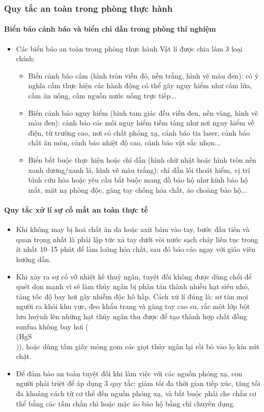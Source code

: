\subsubsection{Quy tắc an toàn trong phòng thực hành}

\paragraph{Biển báo cảnh báo và biển chỉ dẫn trong phòng thí nghiệm}
\begin{itemize}
\item Các biển báo an toàn trong phòng thực hành Vật lí được chia làm 3 loại chính:
\begin{itemize}
\item Biển cảnh báo cấm (hình tròn viền đỏ, nền trắng, hình vẽ màu đen): có ý nghĩa cấm thực hiện các hành động có thể gây nguy hiểm như cấm lửa, cấm ăn uống, cấm nguồn nước uống trực tiếp...
\item Biển cảnh báo nguy hiểm (hình tam giác đều viền đen, nền vàng, hình vẽ màu đen): cảnh báo các mối nguy hiểm tiềm tàng như nơi nguy hiểm về điện, từ trường cao, nơi có chất phóng xạ, cảnh báo tia laser, cảnh báo chất ăn mòn, cảnh báo nhiệt độ cao, cảnh báo vật sắc nhọn...
\item Biển bắt buộc thực hiện hoặc chỉ dẫn (hình chữ nhật hoặc hình tròn nền xanh dương/xanh lá, hình vẽ màu trắng): chỉ dẫn lối thoát hiểm, vị trí bình cứu hỏa hoặc yêu cầu bắt buộc mang đồ bảo hộ như kính bảo hộ mắt, mặt nạ phòng độc, găng tay chống hóa chất, áo choàng bảo hộ...
\end{itemize}
\end{itemize}

\paragraph{Quy tắc xử lí sự cố mất an toàn thực tế}
\begin{itemize}
\item Khi không may bị hoá chất ăn da hoặc axit bám vào tay, bước đầu tiên và quan trọng nhất là phải lập tức xả tay dưới vòi nước sạch chảy liên tục trong ít nhất 10–15 phút để làm loãng hóa chất, sau đó báo cáo ngay với giáo viên hướng dẫn.
\item Khi xảy ra sự cố vỡ nhiệt kế thuỷ ngân, tuyệt đối không được dùng chổi để quét dọn mạnh vì sẽ làm thủy ngân bị phân tán thành nhiều hạt siêu nhỏ, tăng tốc độ bay hơi gây nhiễm độc hô hấp. Cách xử lí đúng là: sơ tán mọi người ra khỏi khu vực, đeo khẩu trang và găng tay cao su, rắc một lớp bột lưu huỳnh lên những hạt thủy ngân thu được để tạo thành hợp chất đồng sunfua không bay hơi (\\(HgS\\)), hoặc dùng tấm giấy mỏng gom các giọt thủy ngân lại rồi bỏ vào lọ kín nút chặt.
\item Để đảm bảo an toàn tuyệt đối khi làm việc với các nguồn phóng xạ, con người phải triệt để áp dụng 3 quy tắc: giảm tối đa thời gian tiếp xúc, tăng tối đa khoảng cách từ cơ thể đến nguồn phóng xạ, và bắt buộc phải che chắn cơ thể bằng các tấm chắn chì hoặc mặc áo bảo hộ bằng chì chuyên dụng.
\end{itemize}

